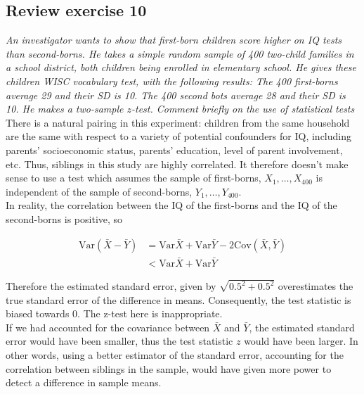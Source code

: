 \documentclass[11pt]{article}
\newcommand{\var}{\textrm{Var}}
\newcommand{\cov}{\textrm{Cov}}
\begin{document}



\subsection*{Review exercise 10} %
\noindent \textit{An investigator wants to show that first-born children score higher on IQ tests than second-borns. He takes a simple random sample of 400 two-child families in a school district, both children being enrolled in elementary school. He gives these children WISC vocabulary test, with the following results: The 400 first-borns average 29 and their SD is 10. The 400 second bots average 28 and their SD is 10. He makes a two-sample $z$-test. Comment briefly on the use of statistical tests}\\

There is a natural pairing in this experiment: children from the same household are the same with respect to a variety of potential confounders for IQ, including parents' socioeconomic status, parents' education, level of parent involvement, etc.  Thus, siblings in this study are highly correlated.  It therefore doesn't make sense to use a test which assumes the sample of first-borns, $X_1, \dots, X_{400}$ is independent of the sample of second-borns, $Y_1, \dots, Y_{400}$.  \\

In reality, the correlation between the IQ of the first-borns and the IQ of the second-borns is positive, so

\begin{align*}
\var(\bar{X} - \bar{Y}) &= \var{\bar{X}} + \var{\bar{Y}} - 2\cov(\bar{X},\bar{Y}) \\
&< \var{\bar{X}} + \var{\bar{Y}} 
\end{align*}

Therefore the estimated standard error, given by $\sqrt{0.5^2 + 0.5^2}$ overestimates the true standard error of the difference in means.  Consequently, the test statistic is biased towards $0$.  The z-test here is inappropriate. \\

If we had accounted for the covariance between $\bar{X}$ and $\bar{Y}$, the estimated standard error would have been smaller, thus the test statistic $z$ would have been larger.  In other words, using a better estimator of the standard error, accounting for the correlation between siblings in the sample, would have given more power to detect a difference in sample means. \\
\end{document}
